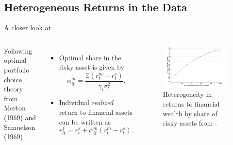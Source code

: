 \documentclass{beamer}
\begin{document}
\subsection{Heterogeneous Returns in the Data}
\begin{frame}{A closer look at \cite{aflgdmlp20}}

   \begin{columns}
     \small
     Following optimal portfolio choice theory from Merton (1969) and Samuelson (1969)
    \centering

    \begin{itemize}
    \item Optimal share in the risky asset is given by
    $$ \alpha_{it}^{m} = \frac{\mathbb{E}(r_{t}^{m} - r_{t}^{s})}{\gamma_i \sigma^{2}_{t}}.$$
    \item Individual \textit{realized} return to financial assets can be written as
    $$ r_{it}^{f} = r_{t}^{s} + \alpha_{it}^{m} (r_{t}^{m} - r_{t}^{s}). $$
    \end{itemize}

    \centering
    \begin{figure}
    \includegraphics[width=\textwidth]{Figures/Fagereng2020Fig1.png}
    \captionsetup{font=scriptsize}
    \caption{Heterogeneity in returns to financial wealth by share of risky assets from \cite{aflgdmlp20}.}
    \end{figure}
  \end{columns}

\end{frame}
\end{document}
